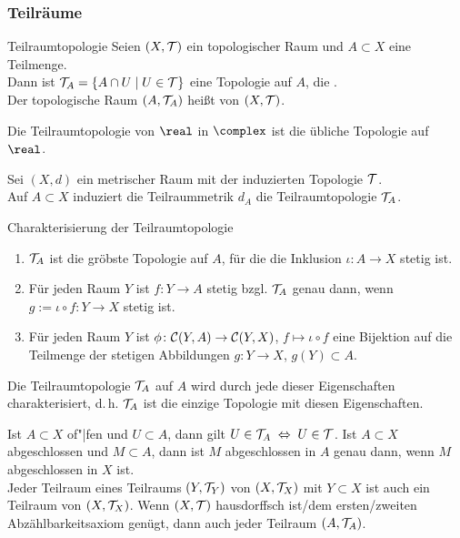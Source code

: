 \subsubsection{%
    Teilräume%
}

\begin{Def}{Teilraumtopologie}
    Seien $(X, \mathcal{T})$ ein topologischer Raum und $A \subset X$ eine Teilmenge. \\
    Dann ist $\mathcal{T}_A = \{A \cap U \;|\; U \in \mathcal{T}\}$ eine Topologie auf $A$,
    die . \\
    Der topologische Raum $(A, \mathcal{T}_A)$ heißt  von $(X, \mathcal{T})$.
\end{Def}

\begin{Bsp}
    Die Teilraumtopologie von $\real$ in $\complex$ ist die übliche Topologie
    auf $\real$.
\end{Bsp}

\begin{Bem}
    Sei $(X, d)$ ein metrischer Raum mit der induzierten Topologie $\mathcal{T}$. \\
    Auf $A \subset X$ induziert die Teilraummetrik $d_A$ die Teilraumtopologie
    $\mathcal{T}_A$.
\end{Bem}

\begin{Satz}{Charakterisierung der Teilraumtopologie}
    \begin{enumerate}
        \item
        $\mathcal{T}_A$ ist die gröbste Topologie auf $A$, für die die Inklusion
        $\iota\colon A \rightarrow X$ stetig ist.

        \item
        Für jeden Raum $Y$ ist $f\colon Y \rightarrow A$ stetig bzgl. $\mathcal{T}_A$
        genau dann, wenn $g := \iota \circ f\colon Y \rightarrow X$ stetig ist.

        \item
        Für jeden Raum $Y$ ist $\phi\colon \mathcal{C}(Y, A) \rightarrow \mathcal{C}(Y, X)$,
        $f \mapsto \iota \circ f$ eine Bijektion auf die Teilmenge der
        stetigen Abbildungen $g\colon Y \rightarrow X$, $g(Y) \subset A$.
    \end{enumerate}
    Die Teilraumtopologie $\mathcal{T}_A$ auf $A$ wird durch jede dieser Eigenschaften
    charakterisiert, d.\,h. $\mathcal{T}_A$ ist die einzige Topologie mit diesen
    Eigenschaften.
\end{Satz}

\begin{Bem}
    Ist $A \subset X$ of"|fen und $U \subset A$,
    dann gilt $U \in \mathcal{T}_A \;\Leftrightarrow\; U \in \mathcal{T}$.
    Ist $A \subset X$ abgeschlossen und $M \subset A$,
    dann ist $M$ abgeschlossen in $A$ genau dann, wenn $M$ abgeschlossen
    in $X$ ist. \\
    Jeder Teilraum eines Teilraums $(Y, \mathcal{T}_Y)$ von $(X, \mathcal{T}_X)$ mit
    $Y \subset X$ ist auch ein Teilraum von $(X, \mathcal{T}_X)$.
    Wenn $(X, \mathcal{T})$ hausdorffsch ist/dem ersten/zweiten Abzählbarkeitsaxiom
    genügt, dann auch jeder Teilraum $(A, \mathcal{T}_A)$.
\end{Bem}

